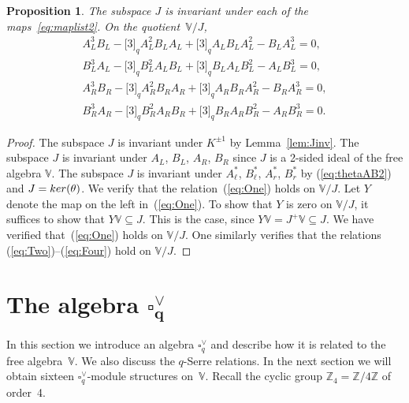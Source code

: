 \documentclass[11pt]{article}
\numberwithin{equation}{section}
\numberwithin{equation}{section}
\newtheorem{Proposition}[Theorem]{Proposition}
 { \theoremstyle{definition}
\newtheorem{Definition}[Theorem]{Definition}
\newtheorem{Example}[Theorem]{Example}
\newtheorem{Note}[Theorem]{Note}
}
\begin{document}
{\begin{Proposition}\label{prop:Jinv} The subspace $J$ is invariant under each of the maps~\eqref{eq:maplist2}. On the quotient~$\mathbb V/J$,
\begin{gather}\label{eq:One}
A_L^3 B_L-\lbrack 3 \rbrack_q A_L^2 B_L A_L+\lbrack 3 \rbrack_q A_L B_L A_L^2-B_L A_L^3 = 0,\\
\label{eq:Two}
B_L^3 A_L-\lbrack 3 \rbrack_q B_L^2 A_L B_L+\lbrack 3 \rbrack_q B_L A_L B_L^2-A_L B_L^3 = 0,\\
\label{eq:Three}
A_R^3 B_R-\lbrack 3 \rbrack_q A_R^2 B_R A_R+\lbrack 3 \rbrack_q A_R B_R A_R^2-B_R A_R^3 = 0,\\
\label{eq:Four}
B_R^3 A_R-\lbrack 3 \rbrack_q B_R^2 A_R B_R+\lbrack 3 \rbrack_q B_R A_R B_R^2-A_R B_R^3 = 0.
\end{gather}
\end{Proposition}
\begin{proof}The subspace $J$ is invariant under $K^{\pm 1}$ by Lemma~\ref{lem:Jinv}. The subspace $J$ is invariant under $A_L$, $B_L$, $A_R$, $B_R$ since $J$ is a 2-sided ideal of the free algebra $\mathbb V$. The subspace $J$ is invariant under $A^*_\ell$, $B^*_\ell$, $A^*_r$, $B^*_r$ by (\ref{eq:thetaAB2}) and $J={\rm ker}(\theta)$. We verify that the relation~(\ref{eq:One}) holds on $\mathbb V/J$. Let $Y$ denote the map on the left in~(\ref{eq:One}). To show that $Y$ is zero on $\mathbb V/J$, it suffices to show that $Y\mathbb V\subseteq J$. This is the case, since $Y\mathbb V = J^+\mathbb V\subseteq J$. We have verified that~(\ref{eq:One}) holds on $\mathbb V/J$. One similarly verifies that the relations (\ref{eq:Two})--(\ref{eq:Four}) hold on $\mathbb V/J$.
\end{proof}

\section[The algebra $\square^\vee_q$]{The algebra $\boldsymbol{\square^\vee_q}$}\label{section10}

In this section we introduce an algebra $\square^\vee_q$ and describe how it is related to the free algebra~$\mathbb V$. We also discuss the $q$-Serre relations. In the next section we will obtain sixteen $\square^\vee_q$-module structures on~$\mathbb V$. Recall the cyclic group $\mathbb Z_4 = \mathbb Z/4 \mathbb Z$ of order~4.

}
\end{document}
